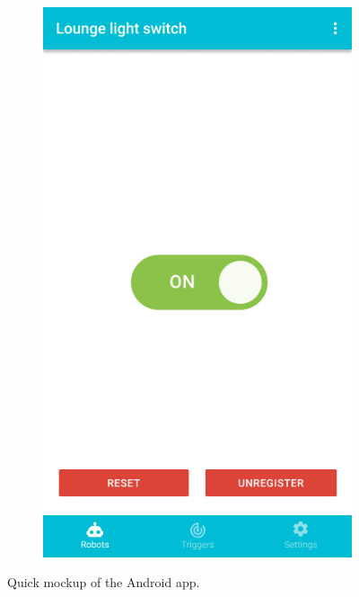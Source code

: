 \documentclass[onecolumn]{IEEEtran}
\begin{document}
\begin{figure}
\begin{subfigure}{.33\textwidth}
        \includegraphics[width=.9\linewidth]{app-3.png}
    \end{subfigure}
    \caption{Quick mockup of the Android app.}
    \label{fig:fig}
\end{figure}
\end{document}
